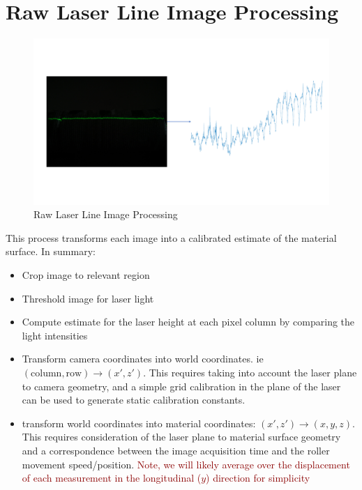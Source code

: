 \documentclass[12pt]{report}
\newcommand{\tcr}[1]{\textcolor{darkRed}{#1}}
\begin{document}
\section{Raw Laser Line Image Processing}

\begin{figure}[h!]
    \centering
    \includegraphics[width=\textwidth,trim={0 5cm 0 5cm},clip]{figures/profile_measure/temp_height_measure.pdf}
    \caption{Raw Laser Line Image Processing}
\end{figure}
This process transforms each image into a calibrated estimate of the material surface. In summary:
    
\begin{itemize}
    \item Crop image to relevant region
    \item Threshold image for laser light
    \item Compute estimate for the laser height at each pixel column by comparing the light intensities
    \item Transform camera coordinates into world coordinates.
    ie $(\text{column}, \text{row}) \rightarrow (x',z')$. This requires taking into account the laser plane to camera geometry, and a simple grid calibration in the plane of the laser can be used to generate static calibration constants.
    \item transform world coordinates into material coordinates: $(x',z') \rightarrow (x,y,z)$. This requires consideration of the laser plane to material surface geometry and a correspondence between the image acquisition time and the roller movement speed/position. \tcr{Note, we will likely average over the displacement of each measurement in the longitudinal ($y$) direction for simplicity}
\end{itemize}
\end{document}

